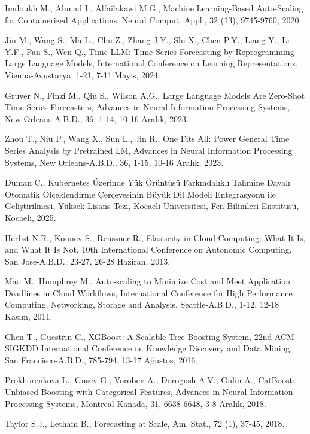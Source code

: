 \begin{enumerate}[label={[\arabic*]}]
\item Imdoukh M., Ahmad I., Alfailakawi M.G., Machine Learning-Based Auto-Scaling for Containerized Applications, Neural Comput. Appl., 32 (13), 9745-9760, 2020.

\item Jin M., Wang S., Ma L., Chu Z., Zhang J.Y., Shi X., Chen P.Y., Liang Y., Li Y.F., Pan S., Wen Q., Time-LLM: Time Series Forecasting by Reprogramming Large Language Models, International Conference on Learning Representations, Vienna-Avusturya, 1-21, 7-11 Mayıs, 2024.

\item Gruver N., Finzi M., Qiu S., Wilson A.G., Large Language Models Are Zero-Shot Time Series Forecasters, Advances in Neural Information Processing Systems, New Orleans-A.B.D., 36, 1-14, 10-16 Aralık, 2023.

\item Zhou T., Niu P., Wang X., Sun L., Jin R., One Fits All: Power General Time Series Analysis by Pretrained LM, Advances in Neural Information Processing Systems, New Orleans-A.B.D., 36, 1-15, 10-16 Aralık, 2023.

\item Duman C., Kubernetes Üzerinde Yük Örüntüsü Farkındalıklı Tahmine Dayalı Otomatik Ölçeklendirme Çerçevesinin Büyük Dil Modeli Entegrasyonu ile Geliştirilmesi, Yüksek Lisans Tezi, Kocaeli Üniversitesi, Fen Bilimleri Enstitüsü, Kocaeli, 2025.

\item Herbst N.R., Kounev S., Reussner R., Elasticity in Cloud Computing: What It Is, and What It Is Not, 10th International Conference on Autonomic Computing, San Jose-A.B.D., 23-27, 26-28 Haziran, 2013.

\item Mao M., Humphrey M., Auto-scaling to Minimize Cost and Meet Application Deadlines in Cloud Workflows, International Conference for High Performance Computing, Networking, Storage and Analysis, Seattle-A.B.D., 1-12, 12-18 Kasım, 2011.

\item Chen T., Guestrin C., XGBoost: A Scalable Tree Boosting System, 22nd ACM SIGKDD International Conference on Knowledge Discovery and Data Mining, San Francisco-A.B.D., 785-794, 13-17 Ağustos, 2016.

\item Prokhorenkova L., Gusev G., Vorobev A., Dorogush A.V., Gulin A., CatBoost: Unbiased Boosting with Categorical Features, Advances in Neural Information Processing Systems, Montreal-Kanada, 31, 6638-6648, 3-8 Aralık, 2018.

\item Taylor S.J., Letham B., Forecasting at Scale, Am. Stat., 72 (1), 37-45, 2018.

\end{enumerate}


